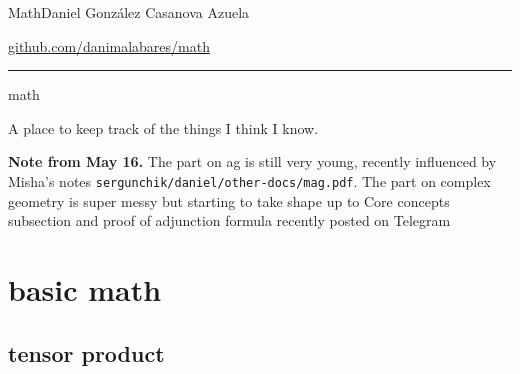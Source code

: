 
%



\begin{minipage}{\textwidth}
	\begin{minipage}{1\textwidth}
		Math\hfill Daniel González Casanova Azuela
		
		{\small \hfill\href{https://github.com/danimalabares/math}{github.com/danimalabares/math}}
	\end{minipage}
\end{minipage}\vspace{.2cm}\hrule
{\huge math}
\vspace{10pt}

A place to keep track of the things I think I know.

\textbf{Note from May 16.} The part on ag is still very young, recently influenced by Misha's notes \texttt{sergunchik/daniel/other-docs/mag.pdf}. The part on complex geometry is super messy but starting to take shape up to Core concepts subsection and proof of adjunction formula recently posted on Telegram
\tableofcontents
\clearpage
\section{basic math}

\subsection{tensor product}

